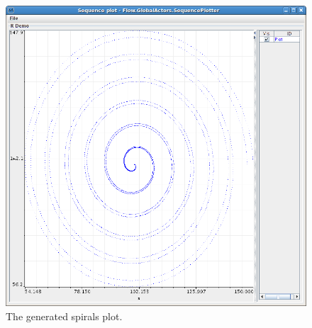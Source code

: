 \documentclass[a4paper]{book}
\begin{document}
\begin{figure}[ht]
	\centering
	\includegraphics[width=\textwidth]{images/spirals-output.png}
	\caption{The generated spirals plot.}
	\label{spirals-output}
\end{figure}

\clearpage
\end{document}
